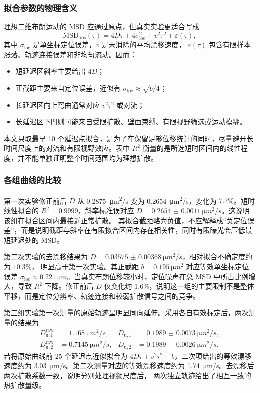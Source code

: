 \documentclass[11pt]{article}
\begin{document}
\subsubsection{拟合参数的物理含义}

理想二维布朗运动的 MSD 应通过原点，但真实实验更适合写成
\begin{equation}
    \mathrm{MSD}_{\mathrm{obs}}(\tau)
    =4D\tau+4\sigma_{\mathrm{loc}}^2+v^2\tau^2+\varepsilon(\tau),
    \label{eq:realmsd}
\end{equation}
其中 $\sigma_{\mathrm{loc}}$ 是单坐标定位误差，$v$ 是未消除的平均漂移速度，
$\varepsilon(\tau)$ 包含有限样本涨落、轨迹连接误差和非均匀流动。因而：
\begin{itemize}
    \item 短延迟区斜率主要给出 $4D$；
    \item 正截距主要来自定位误差，近似有 $\sigma_{\mathrm{loc}}\approx\sqrt{b/4}$；
    \item 长延迟区向上弯曲通常对应 $v^2\tau^2$ 或对流；
    \item 长延迟区下凹则可能来自受限扩散、壁面束缚、有限视野筛选或运动模糊。
\end{itemize}
本文只取最早 10 个延迟点拟合，是为了在保留足够位移统计的同时，尽量避开长时间尺度上的对流和有限视野效应。表中 $R^2$ 衡量的是所选短时区间内的线性程度，并不能单独证明整个时间范围均为理想扩散。

\subsubsection{各组曲线的比较}

第一次实验修正前后 $D$ 从 \SI{0.2875}{\micro m^2/s} 变为
\SI{0.2654}{\micro m^2/s}，变化为 $7.7\%$。短时线性拟合的
$R^2=0.9999$，斜率标准误对应
$D=\SI{0.2654(11)}{\micro m^2/s}$。这说明该组在拟合区间内最接近正常扩散。
其拟合截距略为负值，不应解释成“负定位误差”，而是说明截距与斜率在有限拟合区间内存在相关性，同时有限曝光会压低最短延迟处的 MSD。

第二次实验的去漂移结果为
$D=\SI{0.03575(368)}{\micro m^2/s}$，相对拟合不确定度约为 $10.3\%$，
明显高于第一次实验。其正截距
$b=\SI{0.195}{\micro m^2}$ 对应等效单坐标定位误差
$\sigma_{\mathrm{loc}}\approx\SI{0.221}{\micro m}$。当真实布朗位移较小时，定位噪声在总 MSD 中所占比例增大，导致 $R^2$ 下降。修正前后 $D$ 仅变化约 $1.6\%$，说明这一组的主要限制不是整体平移，而是定位分辨率、轨迹连接和较弱扩散信号之间的竞争。

第三组实验第一次测量的原始轨迹呈明显同向延伸。采用各自有效标定后，两次测量的结果为
\begin{align}
    D_{\mathrm{u},1}^{\mathrm{raw}}&=\SI{1.168}{\micro m^2/s},&
    D_{\mathrm{u},1}&=\SI{0.1989(73)}{\micro m^2/s},\\
    D_{\mathrm{u},2}^{\mathrm{raw}}&=\SI{0.7145}{\micro m^2/s},&
    D_{\mathrm{u},2}&=\SI{0.1989(26)}{\micro m^2/s}.
\end{align}
若将原始曲线前 25 个延迟点近似拟合为
$4D\tau+v^2\tau^2+b$，二次项给出的等效漂移速度约为
\SI{3.03}{\micro m/s}。第二次测量对应的等效漂移速度约为
\SI{1.74}{\micro m/s}。去漂移后两次扩散系数一致，说明分别处理视频尺度后，
两次独立轨迹给出了相互一致的热扩散量级。
\end{document}
